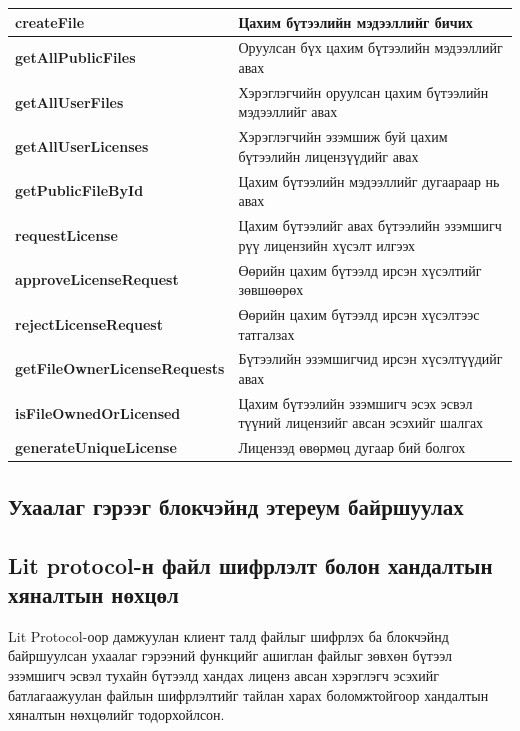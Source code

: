 \begin{table}[h!]
	\centering
   \begin{tabularx}{\textwidth}{|p{}|X|}
		\hline
		 \textbf{createFile}& Цахим бүтээлийн мэдээллийг бичих
	\\ \hline \textbf{getAllPublicFiles} & Оруулсан бүх цахим бүтээлийн мэдээллийг авах
	\\ \hline \textbf{getAllUserFiles} &  Хэрэглэгчийн оруулсан цахим бүтээлийн мэдээллийг авах
	\\ \hline \textbf{getAllUserLicenses} & Хэрэглэгчийн эзэмшиж буй цахим бүтээлийн лицензүүдийг авах
	\\ \hline \textbf{getPublicFileById} & Цахим бүтээлийн мэдээллийг дугаараар нь авах
	\\ \hline \textbf{requestLicense} & Цахим бүтээлийг авах бүтээлийн эзэмшигч рүү лицензийн хүсэлт илгээх
	\\ \hline \textbf{approveLicenseRequest} & Өөрийн цахим бүтээлд ирсэн хүсэлтийг зөвшөөрөх
	\\ \hline \textbf{rejectLicenseRequest} & Өөрийн цахим бүтээлд ирсэн хүсэлтээс татгалзах
	\\ \hline \textbf{getFileOwnerLicenseRequests} & Бүтээлийн эзэмшигчид ирсэн хүсэлтүүдийг авах
	\\ \hline \textbf{isFileOwnedOrLicensed} & Цахим бүтээлийн эзэмшигч эсэх эсвэл түүний лицензийг авсан эсэхийг шалгах
	\\ \hline \textbf{generateUniqueLicense} & Лицензэд өвөрмөц дугаар бий болгох                                                             \\ \hline
	\end{tabularx}
\end{table}

\newpage
\subsection{Ухаалаг гэрээг блокчэйнд этереум байршуулах}


\subsection{Lit protocol-н файл шифрлэлт болон хандалтын хяналтын нөхцөл}
Lit Protocol-оор дамжуулан клиент талд файлыг шифрлэх ба блокчэйнд байршуулсан ухаалаг гэрээний функцийг ашиглан файлыг зөвхөн бүтээл эзэмшигч эсвэл тухайн бүтээлд хандах лиценз авсан хэрэглэгч эсэхийг батлагаажуулан файлын шифрлэлтийг тайлан харах боломжтойгоор хандалтын хяналтын нөхцөлийг тодорхойлсон.

